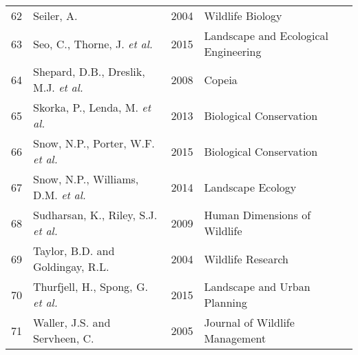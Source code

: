 \begin{longtable}[c]{p{.75cm}p{6cm}p{1.25cm}p{5.5cm}}
   62 & Seiler, A. & 2004 & Wildlife Biology \\ 
   63 & Seo, C., Thorne, J. \textit{et al.} & 2015 & Landscape and Ecological Engineering \\ 
   64 & Shepard, D.B., Dreslik, M.J. \textit{et al.} & 2008 & Copeia \\ 
   65 & Skorka, P., Lenda, M. \textit{et al.} & 2013 & Biological Conservation  \\ 
   66 & Snow, N.P., Porter, W.F. \textit{et al.} & 2015 & Biological Conservation  \\ 
   67 & Snow, N.P., Williams, D.M. \textit{et al.} & 2014 & Landscape Ecology \\ 
   68 & Sudharsan, K., Riley, S.J. \textit{et al.} & 2009 & Human Dimensions of Wildlife \\ 
   69 & Taylor, B.D. and Goldingay, R.L. & 2004 & Wildlife Research \\ 
   70 & Thurfjell, H., Spong, G. \textit{et al.} & 2015 & Landscape and Urban Planning  \\ 
   71 & Waller, J.S. and Servheen, C. & 2005 & Journal of Wildlife Management \\
   \hline
\end{longtable}


%